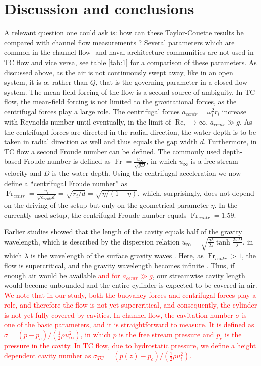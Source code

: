 \documentclass[aps,onecolumn,10pt, floatfix, superscriptaddress,longbibliography, pra]{revtex4-1}
\newcommand{\red}[1]{\textcolor{red}{#1}}
\newcommand{\Fr}{\operatorname{Fr}}
\renewcommand{\Re}{\operatorname{Re}}
\begin{document}
 
\section{Discussion and conclusions}
\label{sec:conclude}

A relevant question one could ask is: how can these Taylor-Couette results be compared with channel flow measurements \citep{murai2014,Foeth2008, cec10}? Several parameters which are common in the channel flow- and naval architecture communities are not used in TC flow and vice versa, see table \ref{tab:1} for a comparison of these parameters. As discussed above, as the air is not continuously swept away, like in an open system, it is $\alpha$, rather than 
$\dot{Q}$, that is the governing parameter in a closed flow system. The mean-field forcing of the flow is a second source of ambiguity. In TC flow, the mean-field forcing is not limited to the gravitational forces, as the centrifugal forces play a large role. The centrifugal forces $a_{centr} = \omega_i^2 r_i$ increase with Reynolds number until eventually,  in the limit of $\Re_i \rightarrow \infty$,  $a_{centr} \gg g$. As the centrifugal forces are directed in the radial direction, the water depth is to be taken in radial direction as well and thus equals the gap width $d$. Furthermore, in TC flow a second Froude number can be defined. The commonly used depth-based Froude number is  defined as $\Fr = \frac{u_{\infty}}{\sqrt{g D}}$, in which $u_{\infty}$ is a free stream velocity and $D$ is the water depth. Using the centrifugal acceleration we now define a ``centrifugal Froude number'' as $\Fr_{centr} = \frac{u_i}{\sqrt{a_{centr}d}} = \sqrt{r_i/d}= \sqrt{\eta / (1-\eta)}$, which, surprisingly, does not depend on the driving of the setup but only on the geometrical parameter $\eta$. In the currently used setup, the centrifugal Froude number equals $\Fr_{centr} = 1.59$. 


Earlier studies showed that the length of the cavity equals half of the gravity wavelength, which is described by the dispersion relation $u_{\infty} = \sqrt{\frac{g \lambda}{2 \pi} \tanh\frac{2 \pi D}{\lambda}}$, in which $\lambda$ is the wavelength of the surface gravity waves \citep{butuzov1967,matveev2003}. Here, as $\Fr_{centr}>1$, the flow is supercritical, and the gravity wavelength becomes infinite \citep{Zverkhovskyi2014}. Thus, if enough air would be available \red{and for $a_{centr} \gg g$}, our streamwise cavity length would become unbounded and the entire cylinder is expected to be covered in air. \red{We note that in our study, both the buoyancy forces and centrifugal forces play a role, and therefore the flow is not yet supercritical, and consequently, the cylinder is not yet fully covered by cavities}.
\red{In channel flow, the cavitation number $\sigma$ is one of the basic parameters, and it is straightforward to measure. It is defined as $\sigma = (p - p_c )/ (\frac12 \rho u^2_{\infty})$, in which $p$ is the free stream pressure and $p_c$ is the pressure in the cavity. In TC flow, due to hydrostatic pressure, we define a height dependent cavity number as $\sigma_{TC} = (p(z) - p_c ) / (\frac12 \rho u^2_i)$.}
\end{document}
